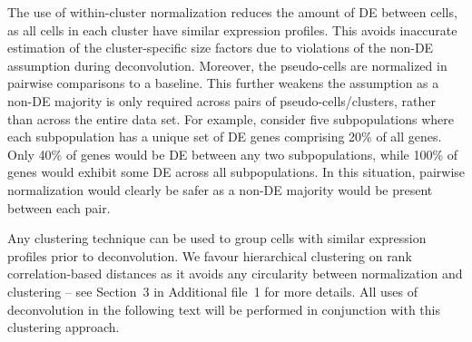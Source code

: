 \documentclass{bmcart}
\newcommand{\suppclustering}{3}
\newcommand{\revised}[1]{#1}
\begin{document}

The use of within-cluster normalization reduces the amount of DE between cells, as all cells in each cluster have similar expression profiles.
This avoids inaccurate estimation of the \revised{cluster-specific} size factors due to violations of the non-DE assumption \revised{during deconvolution}.
Moreover, the pseudo-cells are normalized in pairwise comparisons to a baseline.
This \revised{further} weakens the assumption as a non-DE majority is only required across pairs of pseudo-cells/clusters, rather than across the entire data set.
For example, consider five subpopulations where each \revised{subpopulation} has a unique set of DE genes comprising 20\% of all genes.
Only 40\% of genes would be DE between any two subpopulations, while 100\% of genes would exhibit some DE across all subpopulations.
In this situation, pairwise normalization would clearly be safer as a non-DE majority would be present \revised{between each pair}.

Any clustering technique can be used to group cells with similar expression profiles prior to deconvolution.
We favour hierarchical clustering on rank correlation-based distances as it avoids any circularity between normalization and clustering
    -- see Section~\suppclustering{} in Additional file~1 for more details.
All uses of deconvolution in the following text will be performed in conjunction with this clustering approach.
\end{document}
